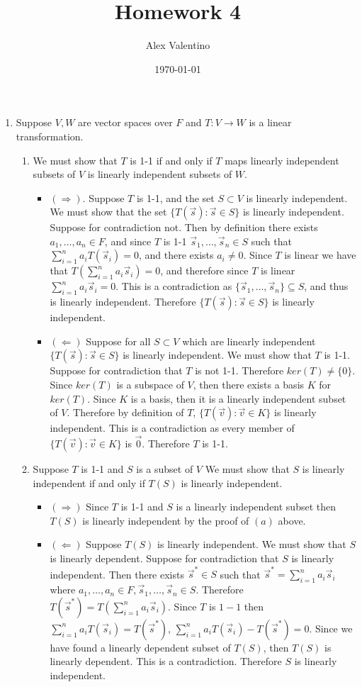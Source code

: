 \documentclass[12pt, letterpaper]{article}
\date{\today}
\author{Alex Valentino}
\title{Homework 4}
\begin{document}
\begin{enumerate}
	\item Suppose $V,W$ are vector spaces over $F$ and $T : V \to W$ is a linear transformation.
	\begin{enumerate}
		\item   We must show that $T$ is 1-1 if and only if $T$ maps linearly independent subsets of $V$ is linearly independent subsets of $W$.  
		\begin{itemize}
			\item $(\Rightarrow)$.  Suppose $T$ is 1-1, and the set $S \subset V$ is linearly independent.  We must show that the set $\{T(\Vec{s}): \Vec{s} \in S\}$ is linearly independent.  Suppose for contradiction not.  Then by definition there exists $a_1,\ldots,a_n \in F$, and since $T$ is 1-1 $\Vec{s}_1,\ldots,\Vec{s}_n \in S$ such that $\sum_{i=1}^n a_i T(\Vec{s}_i) = 0$, and there exists $a_i \neq 0$.  Since $T$ is linear we have that $T(\sum_{i=1}^n a_i \Vec{s}_i) = 0$, and therefore since $T$ is linear $\sum_{i=1}^n a_i \Vec{s}_i = 0$.  This is a contradiction as $\{ \Vec{s}_1,\ldots, \Vec{s}_n \} \subseteq S$, and thus is linearly independent.  Therefore $\{T( \Vec{s}):  \Vec{s} \in S\}$ is linearly independent.  
			\item $(\Leftarrow)$ Suppose for all $S \subset V$ which are linearly independent $\{T( \Vec{s}) :  \Vec{s} \in S\}$ is linearly independent.  We must show that $T$ is 1-1.  Suppose for contradiction that $T$ is not 1-1.  Therefore $ker(T)  \neq \{0\}$.  Since $ker(T)$ is a subspace of $V$, then there exists a basis $K$ for $ker(T)$.  Since $K$ is a basis, then it is a linearly independent subset of $V$.  Therefore by definition of $T$, $\{T(\Vec{v}):\Vec{v} \in K\}$ is linearly independent.  This is a contradiction as every member of $\{T(\Vec{v}):\Vec{v} \in K\}$  is $\Vec{0}$.  Therefore $T$ is 1-1.  
		\end{itemize}
		\item Suppose $T$ is 1-1 and $S$ is a subset of $V$ We must show that $S$ is linearly independent if and only if $T(S)$ is linearly independent.  
		\begin{itemize}
			\item $(\Rightarrow)$ Since $T$ is 1-1 and $S$ is a linearly independent subset then $T(S)$ is linearly independent by the proof of $(a)$ above.  
			\item $(\Leftarrow)$ Suppose $T(S)$ is linearly independent.  We must show that $S$ is linearly dependent.  Suppose for contradiction that $S$ is linearly independent.  Then there exists $\Vec{s}^* \in S$ such that $\Vec{s}^* = \sum_{i=1}^n a_i \Vec{s}_i$ where $a_1,\ldots,a_n \in F, \Vec{s}_1,\ldots,\Vec{s}_n \in S$.  Therefore $T(\Vec{s}^*) = T(\sum_{i=1}^n a_i \Vec{s}_i)$. Since $T$ is $1-1$ then $\sum_{i=1}^n a_i T(\Vec{s}_i) = T(\Vec{s}^*)$, $\sum_{i=1}^n a_i T(\Vec{s}_i) - T(\Vec{s}^*) = 0$.  Since we have found a linearly dependent subset of $T(S)$, then $T(S)$ is linearly dependent.  This is a contradiction.  Therefore $S$ is linearly independent.  

\end{itemize}
\end{enumerate}
\end{enumerate}
\end{document}
